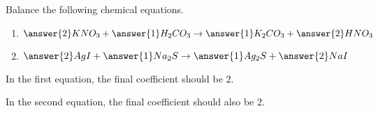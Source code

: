 \documentclass{ximera}
\author{Zack Reed}
\begin{document}
\begin{problem}

Balance the following chemical equations. 

\begin{enumerate}

    \item $\answer{2}KNO_3+\answer{1}H_2CO_3\rightarrow \answer{1}K_2CO_3+\answer{2}HNO_3$
    
    \item $\answer{2}AgI+\answer{1}Na_2S\rightarrow \answer{1}Ag_2S+\answer{2}NaI$
    
\end{enumerate}

In the first equation, the final coefficient should be 2. 

In the second equation, the final coefficient should also be 2.

\end{problem}
\end{document}
